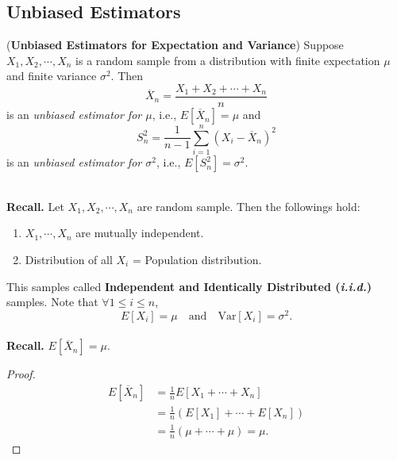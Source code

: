 \documentclass[12pt,a4paper]{article}
\newcommand{\Var}{\text{Var}}
\begin{document}
\subsection{Unbiased Estimators}
\begin{tcolorbox}[colback=white]
	(\textbf{Unbiased Estimators for Expectation and Variance}) Suppose $X_1,X_2,\cdots,X_n$ is a random sample from a distribution with finite expectation $\mu$ and finite variance $\sigma^2$. Then \[
	\overline{X}_n=\frac{X_1+X_2+\cdots+X_n}{n}
	\] is an \textit{unbiased estimator for $\mu$}, i.e., $E[\overline{X}_n]=\mu$ and \[
	S_n^2=\frac{1}{n-1}\sum_{i=1}^n(X_i-\overline{X}_n)^2
	\] is an \textit{unbiased estimator for $\sigma^2$}, i.e., $E[S_n^2]=\sigma^2$.
\end{tcolorbox}\
\\
\textbf{Recall.} Let $X_1,X_2,\cdots,X_n$ are random sample. Then the followings hold:\begin{enumerate}[($i$)]
	\item $X_1,\cdots,X_n$ are mutually independent.
	\item Distribution of all $X_i$ = Population distribution.
\end{enumerate} This samples called \textbf{Independent and Identically Distributed (\textit{i.i.d.})} samples. Note that $\forall1\leq i\leq n$, \[
E[X_i]=\mu\quad\text{and}\quad \Var[X_i]=\sigma^2.
\]
\\
\textbf{Recall.} $E[\overline{X}_n]=\mu$. \begin{proof}\begin{align*}
	E[\overline{X}_n] &= \frac{1}{n}E[X_1+\cdots+X_n] \\
	&= \frac{1}{n}(E[X_1]+\cdots+E[X_n]) \\
	&= \frac{1}{n}(\mu+\cdots+\mu) = \mu.
	\end{align*}
\end{proof}\
\end{document}
